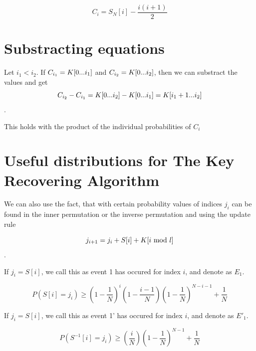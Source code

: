 

\begin{notation}
		\[  C_{i} = S_{N}[i] - \dfrac{i(i+1)}{2} \]
\end{notation}






\section{Substracting equations}

Let $i_{1} < i_{2} $. If $ C_{i_{1}} = K[{0}...{i_{1}}] $ and $ C_{i_{2}} = K[{0}...{i_{2}}] $, then we can substract the values and get
\[ C_{i_{2}} - C_{i_{1}} = K[{0}...{i_{2}}] - K[{0}...{i_{1}}] = K[{i_{1} + 1}...{i_{2}}]	\].

This holds with the product of the individual probabilities of $ C_{i} $



\section{Useful distributions for The Key Recovering Algorithm}
We can also use the fact, that with certain probability values of indices $ j_{i} $ can be found in the inner permutation or the inverse permutation and using the update rule

\[ j_{i+1} = j_{i} + S[i] + K[i\ \text{mod}\ l] \].



\begin{defn}
If $ j_{i} = S[i] $, we call this as event 1 has occured for index $ i $, and denote as $ E_{1} $.
\end{defn}

\begin{thm}
\[	P(S[i] = j_{i}) \geq (1-\dfrac{1}{N})^{i}(1-\dfrac{i-1}{N})(1-\dfrac{1}{N})^{N-i-1}+ \dfrac{1}{N} \]
\end{thm}

\begin{defn}
	If $ j_{i} = S[i] $, we call this as event 1' has occured for index $ i $, and denote as $ E'_{1} $.
\end{defn}

\begin{thm}
	\[	P(S^{-1}[i] = j_{i}) \geq (\dfrac{i}{N})(1-\dfrac{1}{N})^{N-1}+ \dfrac{1}{N}\]
\end{thm}


